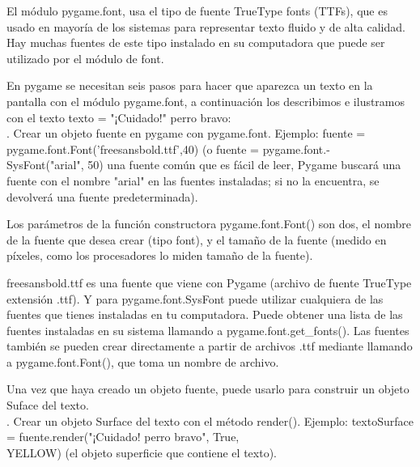 El módulo {\ttfamily pygame.font},  usa el tipo de fuente TrueType fonts (TTFs), que es usado en  mayoría de los sistemas 
para representar  texto fluido y de alta calidad. Hay muchas fuentes de este tipo instalado en su computadora que puede 
ser utilizado por el módulo de {\ttfamily font}.


En {\ttfamily pygame} se necesitan seis pasos para hacer que aparezca un texto en la pantalla con  el módulo {\ttfamily pygame.font},  a continuación los describimos e ilustramos con el texto {\ttfamily texto = "{}¡Cuidado!"{ } perro bravo}:\\

. Crear un objeto fuente en {\ttfamily pygame}  con {\ttfamily pygame.font}. Ejemplo:  {\ttfamily  fuente = pygame.font.Font('freesansbold.ttf',40)}  (o  {\ttfamily fuente = pygame.font.-\\SysFont("{}arial"{}, 50)} una fuente común que es fácil de leer, Pygame buscará una fuente con el nombre "{}arial"{} en las fuentes instaladas; si  no la encuentra, se devolverá una fuente predeterminada). 

Los parámetros de la función constructora {\ttfamily pygame.font.Font()} son dos, el nombre de la fuente que desea crear  (tipo font),  y el tamaño de la fuente (medido en píxeles, como los procesadores lo miden tamaño de la fuente).

{\ttfamily  freesansbold.ttf} es una fuente que viene con Pygame (archivo de fuente TrueType extensión .ttf).  Y  para {\ttfamily pygame.font.SysFont} puede utilizar cualquiera de las fuentes que tienes instaladas en tu computadora. Puede obtener una lista de las fuentes instaladas en su sistema llamando a {\ttfamily pygame.font.get\_fonts()}.   Las fuentes también se pueden crear directamente a partir de archivos {\ttfamily  .ttf } mediante llamando a {\ttfamily  pygame.font.Font()}, que toma un nombre de archivo. 

Una vez que haya creado un objeto fuente, puede usarlo para construir un objeto Suface del texto.\\

. Crear un objeto Surface del texto con  el método {\ttfamily render()}. Ejemplo: 
{\ttfamily textoSurface = fuente.render("{}¡Cuidado!{} perro bravo", True,\\ YELLOW)} (el objeto superficie que contiene el texto). 

